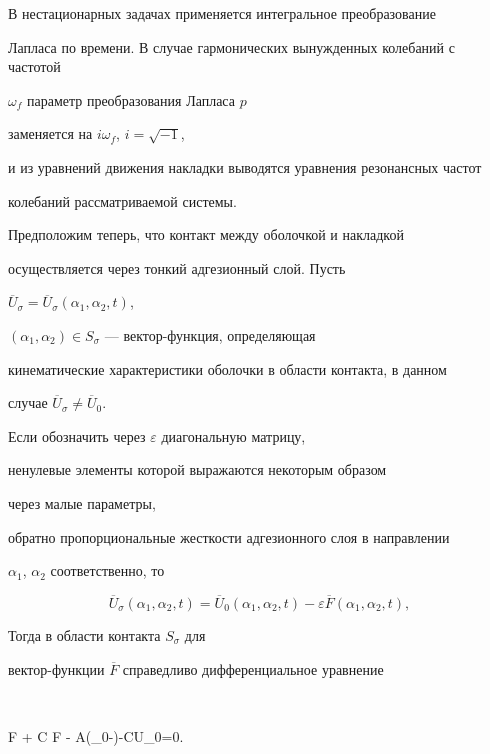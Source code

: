 В нестационарных задачах применяется интегральное преобразование


Лапласа по времени. В случае гармонических вынужденных колебаний с частотой


$\omega_{f}$ параметр преобразования Лапласа $p$


заменяется на $i \omega_{f}$, $i=\sqrt{-1}$,


и из уравнений движения накладки выводятся уравнения резонансных частот


колебаний рассматриваемой системы.





Предположим теперь, что контакт между оболочкой и накладкой


осуществляется через тонкий адгезионный слой. Пусть


$\overline U_{\sigma}=\overline U_{\sigma} (\alpha_{1},\alpha_{2},t)$,


$(\alpha_{1},\alpha_{2})\in S_{\sigma}$ --- вектор-функция, определяющая


кинематические характеристики оболочки в области контакта, в данном


случае $\overline U_{\sigma}\not= \overline U_{0}$.


Если обозначить через $\varepsilon$ диагональную матрицу,


ненулевые элементы которой выражаются некоторым образом


через малые параметры,


обратно пропорциональные жесткости адгезионного слоя в направлении


$\alpha_{1}$, $\alpha_{2}$ соответственно, то


\begin{equation}


\overline U_{\sigma}(\alpha_{1},\alpha_{2},t)=


\overline U_{0}(\alpha_{1},\alpha_{2},t)-\varepsilon


\overline F(\alpha_{1},\alpha_{2},t),


\tag{1.6}


\end{equation}


Тогда в области контакта $S_{\sigma}$ для


вектор-функции $\overline F$ справедливо дифференциальное уравнение


$$


\overline F + \varepsilon C \overline F - A(_{0}-\varepsilon{})-C\overline U_{0}=0.


